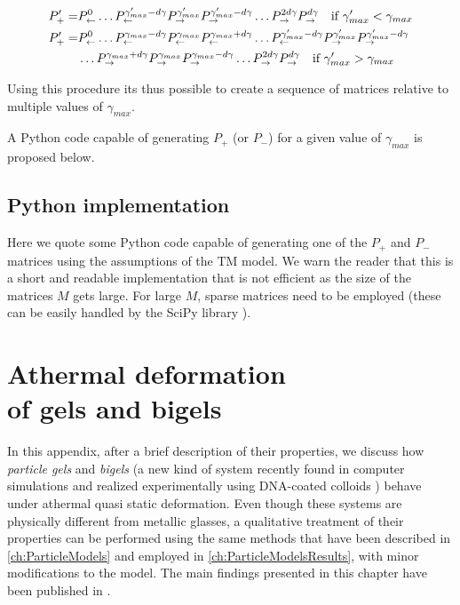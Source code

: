 \begin{align}
P_{+}' = &
P_{\leftarrow}^{0}
\ldots
P_{\leftarrow}^{\gamma_{max}' - d\gamma}
P_{\rightarrow}^{\gamma_{max}'}
P_{\rightarrow}^{\gamma_{max}' - d\gamma}
\ldots
P_{\rightarrow}^{2d\gamma}
P_{\rightarrow}^{d\gamma} 
\quad \text{if } \gamma_{max}' < \gamma_{max} \\
P_{+}' = &
P_{\leftarrow}^{0}
\ldots
P_{\leftarrow}^{\gamma_{max} - d\gamma}
P_{\leftarrow}^{\gamma_{max}}
P_{\leftarrow}^{\gamma_{max} + d\gamma}
\ldots
P_{\leftarrow}^{\gamma_{max}' - d\gamma}
P_{\rightarrow}^{\gamma_{max}'} 
P_{\rightarrow}^{\gamma_{max}' - d\gamma} \notag\\
&
\ldots 
P_{\rightarrow}^{\gamma_{max} + d\gamma}
P_{\rightarrow}^{\gamma_{max}}
P_{\rightarrow}^{\gamma_{max} - d\gamma}
\ldots
P_{\rightarrow}^{2d\gamma}
P_{\rightarrow}^{d\gamma} 
\quad \text{if } \gamma_{max}' > \gamma_{max} 
\end{align}

Using this procedure its thus possible to create a sequence of matrices relative to multiple values of $\gamma_{max}$.

A Python code capable of generating $P_{+}$ (or $P_{-}$) for a given value of $\gamma_{max}$ is proposed below.

\section*{Python implementation}

Here we quote some Python code capable of generating one of the $P_{+}$ and $P_{-}$ matrices using the assumptions of the TM model. We warn the reader that this is a short and readable implementation that is not efficient as the size of the matrices $M$ gets large. For large $M$, sparse matrices need to be employed (these can be easily handled by the SciPy library \cite{scipy}).   

\begin{quote}
\small
    \normalsize
\end{quote}

\chapter[Athermal deformation of gels and bigels]{Athermal deformation \\ of gels and bigels \label{app:Gels}}

In this appendix, after a brief description of their properties, we discuss how \emph{particle gels} and \emph{bigels} (a new kind of system recently found in computer simulations and realized experimentally using DNA-coated colloids \cite{varrato2012arrested}) behave under athermal quasi static deformation. Even though these systems are physically different from metallic glasses, a qualitative treatment of their properties can be performed using the same methods that have been described in \autoref{ch:ParticleModels} and employed in \autoref{ch:ParticleModelsResults}, with minor modifications to the model. 
The main findings presented in this chapter have been published in \cite{dimichele2013aggregation}.

